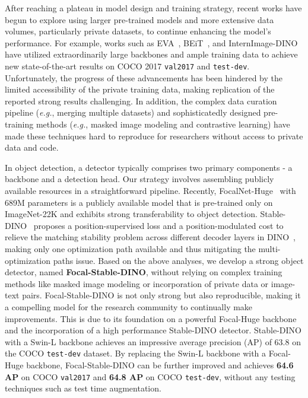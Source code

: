 \documentclass{article}
\begin{document}
After reaching a plateau in model design and training strategy, recent works have begun to explore using larger pre-trained models and more extensive data volumes, particularly private datasets, to continue enhancing the model's performance. 
For example, works such as EVA~\cite{fang2022eva, fang2023eva}, BEiT~\cite{wang2022image}, and InternImage-DINO~\cite{wang2022internimage} have utilized extraordinarily large backbones and ample training data to achieve new state-of-the-art results on COCO 2017 \texttt{val2017} and \texttt{test-dev}.
Unfortunately, the progress of these advancements has been hindered by the limited accessibility of the private training data, making replication of the reported strong results challenging. In addition, the complex data curation pipeline (\textit{e.g.}, merging multiple datasets) and sophisticatedly designed pre-training methods (\textit{e.g.}, masked image modeling and contrastive learning) have made these techniques hard to reproduce for researchers without access to private data and code.

In object detection, a detector typically comprises two primary components - a backbone and a detection head. Our strategy involves assembling publicly available resources in a straightforward pipeline. Recently, FocalNet-Huge~\cite{yang2022focal} with 689M parameters is a publicly available model that is pre-trained only on ImageNet-22K \cite{deng2009imagenet} and exhibits strong transferability to object detection. Stable-DINO~\cite{liu2023detection} proposes a position-supervised loss and a position-modulated cost to relieve the matching stability problem across different decoder layers in DINO~\cite{zhang2022dino}, making only one optimization path available and thus mitigating the multi-optimization paths issue.
Based on the above analyses, we develop a strong object detector, named \textbf{Focal-Stable-DINO}, without relying on complex training methods like masked image modeling or incorporation of private data or image-text pairs. 
Focal-Stable-DINO is not only strong but also reproducible, making it a compelling model for the research community to continually make improvements. This is due to its foundation on a powerful Focal-Huge backbone and the incorporation of a high performance Stable-DINO detector.
Stable-DINO with a Swin-L backbone achieves an impressive average precision (AP) of 63.8 on the COCO \texttt{test-dev} dataset.
By replacing the Swin-L backbone with a Focal-Huge backbone, Focal-Stable-DINO can be further improved and achieves \textbf{64.6 AP} on COCO \texttt{val2017} and \textbf{64.8 AP} on COCO \texttt{test-dev}, without any testing techniques such as test time augmentation. 
\end{document}
